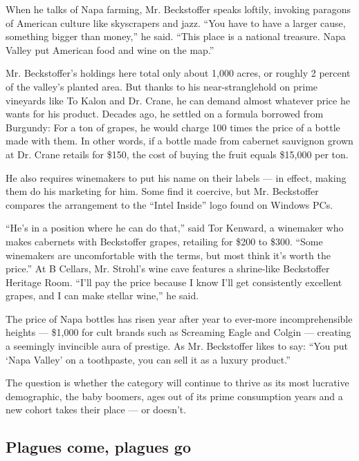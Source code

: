 When he talks of Napa farming, Mr. Beckstoffer speaks loftily, invoking
paragons of American culture like skyscrapers and jazz. ``You have to
have a larger cause, something bigger than money,'' he said. ``This
place is a national treasure. Napa Valley put American food and wine on
the map.''

Mr. Beckstoffer's holdings here total only about 1,000 acres, or roughly
2 percent of the valley's planted area. But thanks to his
near-stranglehold on prime vineyards like To Kalon and Dr. Crane, he can
demand almost whatever price he wants for his product. Decades ago, he
settled on a formula borrowed from Burgundy: For a ton of grapes, he
would charge 100 times the price of a bottle made with them. In other
words, if a bottle made from cabernet sauvignon grown at Dr. Crane
retails for \$150, the cost of buying the fruit equals \$15,000 per ton.

He also requires winemakers to put his name on their labels --- in
effect, making them do his marketing for him. Some find it coercive, but
Mr. Beckstoffer compares the arrangement to the ``Intel Inside'' logo
found on Windows PCs.

``He's in a position where he can do that,'' said Tor Kenward, a
winemaker who makes cabernets with Beckstoffer grapes, retailing for
\$200 to \$300. ``Some winemakers are uncomfortable with the terms, but
most think it's worth the price.'' At B Cellars, Mr. Strohl's wine cave
features a shrine-like Beckstoffer Heritage Room. ``I'll pay the price
because I know I'll get consistently excellent grapes, and I can make
stellar wine,'' he said.

The price of Napa bottles has risen year after year to ever-more
incomprehensible heights --- \$1,000 for cult brands such as Screaming
Eagle and Colgin --- creating a seemingly invincible aura of prestige.
As Mr. Beckstoffer likes to say: ``You put `Napa Valley' on a
toothpaste, you can sell it as a luxury product.''

The question is whether the category will continue to thrive as its most
lucrative demographic, the baby boomers, ages out of its prime
consumption years and a new cohort takes their place --- or doesn't.

\hypertarget{plagues-come-plagues-go}{%
\subsection{Plagues come, plagues go}\label{plagues-come-plagues-go}}

